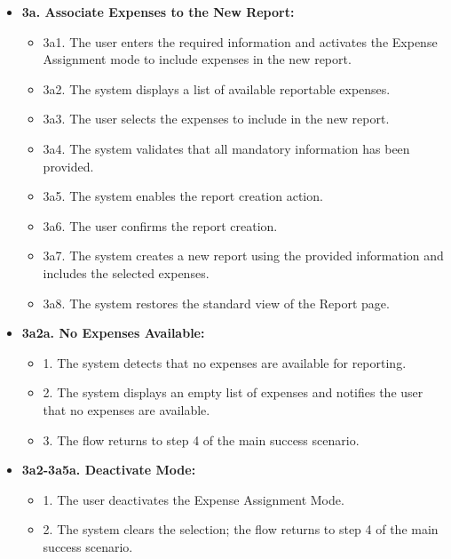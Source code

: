 \begin{itemize} [label={}, leftmargin=0.75cm, noitemsep]

    \item \textbf{3a. Associate Expenses to the New Report:}
    \begin{itemize} [label={}, leftmargin=0.75cm, noitemsep]
        \item 3a1. The user enters the required information and activates the Expense Assignment mode to include expenses in the new report.
        \item 3a2. The system displays a list of available reportable expenses.
        \item 3a3. The user selects the expenses to include in the new report.
        \item 3a4. The system validates that all mandatory information has been provided.
        \item 3a5. The system enables the report creation action.
        \item 3a6. The user confirms the report creation.
        \item 3a7. The system creates a new report using the provided information and includes the selected expenses.
        \item 3a8. The system restores the standard view of the Report page.
    \end{itemize}

    \item \textbf{3a2a. No Expenses Available:}
    \begin{itemize} [label={}, leftmargin=0.75cm, noitemsep]
        \item 1. The system detects that no expenses are available for reporting.
        \item 2. The system displays an empty list of expenses and notifies the user that no expenses are available.
        \item 3. The flow returns to step 4 of the main success scenario.
    \end{itemize}

    \item \textbf{3a2-3a5a. Deactivate Mode:}
    \begin{itemize} [label={}, leftmargin=0.75cm, noitemsep]
        \item 1. The user deactivates the Expense Assignment Mode.
        \item 2. The system clears the selection; the flow returns to step 4 of the main success scenario.
    \end{itemize}


\end{itemize}
